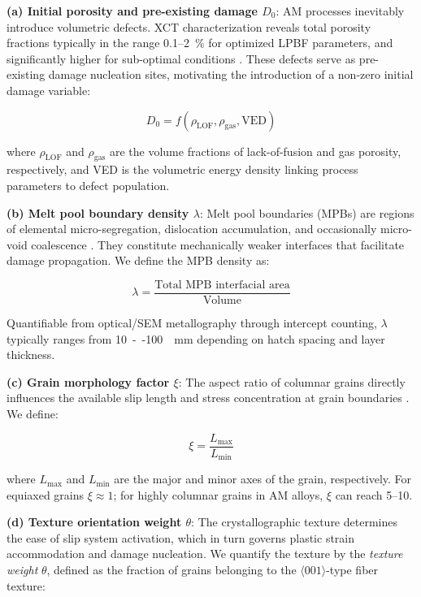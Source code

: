 \textbf{(a) Initial porosity and pre-existing damage $D_0$}: AM processes inevitably introduce volumetric defects. XCT characterization reveals total porosity fractions typically in the range \num{0.1}{--}\SI{2}{\percent} for optimized LPBF parameters, and significantly higher for sub-optimal conditions \cite{kasherman2020porosity}. These defects serve as pre-existing damage nucleation sites, motivating the introduction of a non-zero initial damage variable:

\begin{equation}
D_0 = f(\rho_{\text{LOF}}, \rho_{\text{gas}}, \text{VED})
\label{eq:D0}
\end{equation}

where $\rho_{\text{LOF}}$ and $\rho_{\text{gas}}$ are the volume fractions of lack-of-fusion and gas porosity, respectively, and VED is the volumetric energy density linking process parameters to defect population.

\textbf{(b) Melt pool boundary density $\lambda$}: Melt pool boundaries (MPBs) are regions of elemental micro-segregation, dislocation accumulation, and occasionally micro-void coalescence \cite{thijs2010study}. They constitute mechanically weaker interfaces that facilitate damage propagation. We define the MPB density as:

\begin{equation}
\lambda = \frac{\text{Total MPB interfacial area}}{\text{Volume}}
\label{eq:lambda}
\end{equation}

Quantifiable from optical/SEM metallography through intercept counting, $\lambda$ typically ranges from \SI{10}{--}\SI{100}{\per\milli\meter} depending on hatch spacing and layer thickness.

\textbf{(c) Grain morphology factor $\xi$}: The aspect ratio of columnar grains directly influences the available slip length and stress concentration at grain boundaries \cite{carroll2015anisotropic}. We define:

\begin{equation}
\xi = \frac{L_{\text{max}}}{L_{\text{min}}}
\label{eq:xi}
\end{equation}

where $L_{\text{max}}$ and $L_{\text{min}}$ are the major and minor axes of the grain, respectively. For equiaxed grains $\xi \approx 1$; for highly columnar grains in AM alloys, $\xi$ can reach 5--10.

\textbf{(d) Texture orientation weight $\theta$}: The crystallographic texture determines the ease of slip system activation, which in turn governs plastic strain accommodation and damage nucleation. We quantify the texture by the \emph{texture weight} $\theta$, defined as the fraction of grains belonging to the $\langle001\rangle$-type fiber texture:

